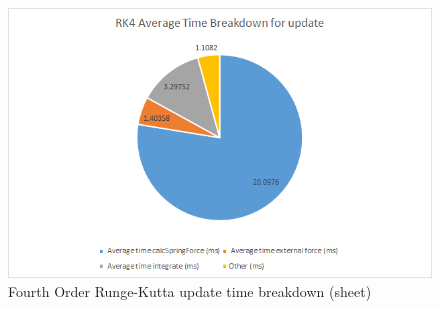     \begin{figure}
    \begin{center}
      \includegraphics[scale=.9]{Figures/sheet_rk4_ut}
    \end{center}
    \caption{Fourth Order Runge-Kutta update time breakdown (sheet)}
    \label{fig:rk4 ut sheet}
  \end{figure}

